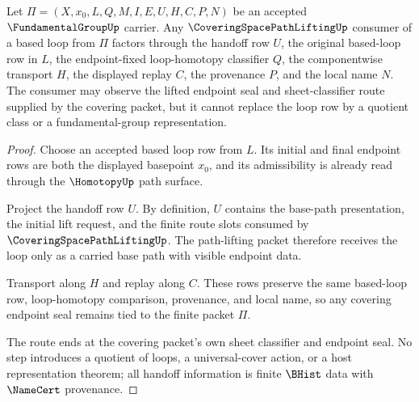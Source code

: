 \begin{theorem}
\label{thm:fundamental-group-covering-path-route}
Let $\Pi=(X,x_0,L,Q,M,I,E,U,H,C,P,N)$ be an accepted $\FundamentalGroupUp$ carrier. Any $\CoveringSpacePathLiftingUp$ consumer of a based loop from $\Pi$ factors through the handoff row $U$, the original based-loop row in $L$, the endpoint-fixed loop-homotopy classifier $Q$, the componentwise transport $H$, the displayed replay $C$, the provenance $P$, and the local name $N$. The consumer may observe the lifted endpoint seal and sheet-classifier route supplied by the covering packet, but it cannot replace the loop row by a quotient class or a fundamental-group representation.
\end{theorem}
\begin{proof}
Choose an accepted based loop row from $L$. Its initial and final endpoint rows are both the displayed basepoint $x_0$, and its admissibility is already read through the $\HomotopyUp$ path surface.

Project the handoff row $U$. By definition, $U$ contains the base-path presentation, the initial lift request, and the finite route slots consumed by $\CoveringSpacePathLiftingUp$. The path-lifting packet therefore receives the loop only as a carried base path with visible endpoint data.

Transport along $H$ and replay along $C$. These rows preserve the same based-loop row, loop-homotopy comparison, provenance, and local name, so any covering endpoint seal remains tied to the finite packet $\Pi$.

The route ends at the covering packet's own sheet classifier and endpoint seal. No step introduces a quotient of loops, a universal-cover action, or a host representation theorem; all handoff information is finite $\BHist$ data with $\NameCert$ provenance.
\end{proof}


